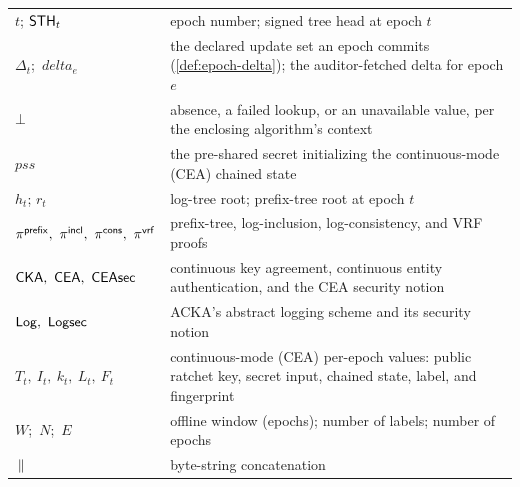 \documentclass[11pt,a4paper,oneside]{report}
\theoremstyle{definition}
\begin{document}
\begin{tabular}{@{}lp{9.5cm}@{}}
$t$; $\mathsf{STH}_t$ & epoch number; signed tree head at epoch $t$ \\
$\Delta_t$;\ $\mathit{delta}_e$ & the declared update set an epoch commits (\cref{def:epoch-delta}); the auditor-fetched delta for epoch $e$ \\
$\bot$ & absence, a failed lookup, or an unavailable value, per the enclosing algorithm's context \\
$\mathit{pss}$ & the pre-shared secret initializing the continuous-mode (CEA) chained state \\
$h_t$; $r_t$ & log-tree root; prefix-tree root at epoch $t$ \\
$\pprefix,\ \pincl,\ \pcons,\ \pvrf$ & prefix-tree, log-inclusion, log-consistency, and VRF proofs \\
$\CKA,\ \CEA,\ \CEAsec$ & continuous key agreement, continuous entity authentication, and the CEA security notion \\
$\Log,\ \Logsec$ & ACKA's abstract logging scheme and its security notion \\
$T_t,\ I_t,\ k_t,\ L_t,\ F_t$ & continuous-mode (CEA) per-epoch values: public ratchet key, secret input, chained state, label, and fingerprint \\
$W$;\ $N$;\ $E$ & offline window (epochs); number of labels; number of epochs \\
$\,\|\,$ & byte-string concatenation \\
\bottomrule
\end{tabular}
\par
\endgroup

\hypersetup{pageanchor=true} %










\printbibliography[heading=bibintoc]

\appendix
{}   %
\end{document}
